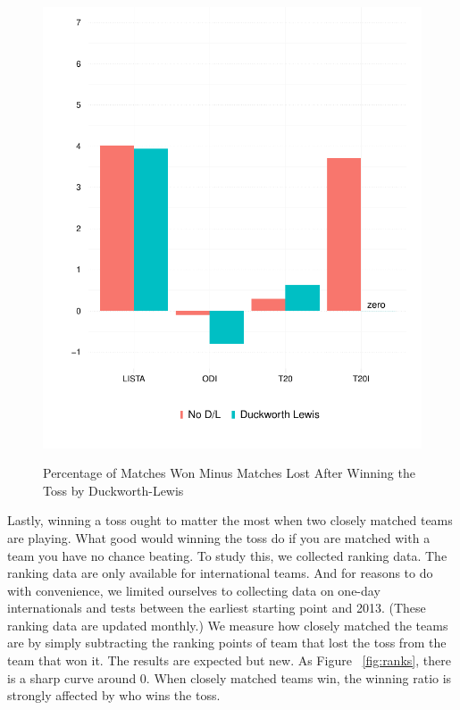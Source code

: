 \documentclass[11pt]{article}
\begin{document}
\begin{figure}[htbp]
\centering
\caption{Percentage of Matches Won Minus Matches Lost After Winning the Toss by Duckworth-Lewis}
\includegraphics[scale=.85]{../figs/winbyDL.pdf}
\label{fig:dl}
\end{figure}

Lastly, winning a toss ought to matter the most when two closely matched teams are playing. What good would winning the toss do if you are matched with a team you have no chance beating. To study this, we collected ranking data. The ranking data are only available for international teams. And for reasons to do with convenience, we limited ourselves to collecting data on one-day internationals and tests between the earliest starting point and 2013. (These ranking data are updated monthly.) We measure how closely matched the teams are by simply subtracting the ranking points of team that lost the toss from the team that won it. The results are expected but new. As Figure ~\ref{fig:ranks}, there is a sharp curve around 0. When closely matched teams win, the winning ratio is strongly affected by who wins the toss.
\end{document}
